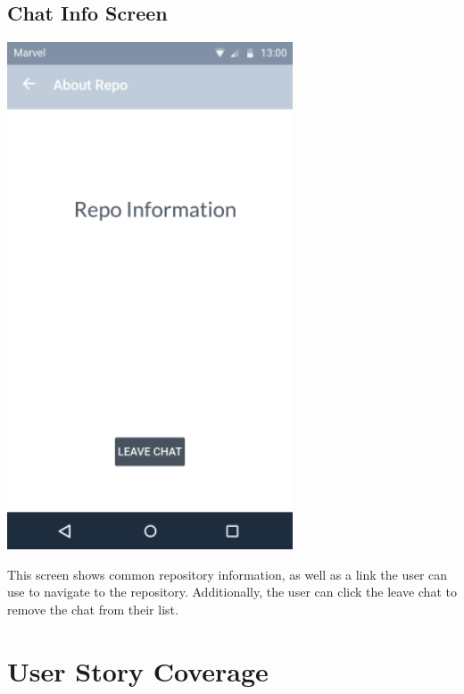 \documentclass{report}
\begin{document}
\subsection{Chat Info Screen}
\begin{center}
    \includegraphics[scale=0.5]{design-chat-info}
\end{center}
This screen shows common repository information, as well as a link the user can use to navigate to the repository. Additionally, the user can click the leave chat to remove the chat from their list.

\newpage
\section{User Story Coverage}
\end{document}
